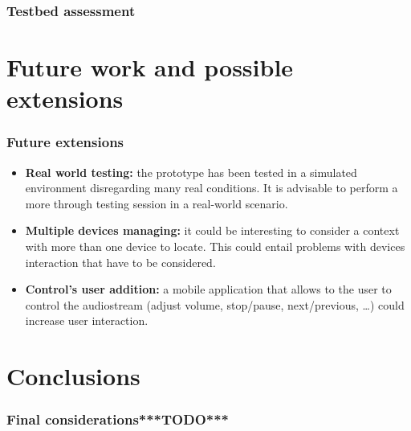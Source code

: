 \documentclass{beamer}
\begin{document}
\begin{frame}
		
		
		
		
		
		
		
		
		
		
	\end{frame}
	
	\begin{frame}
		\frametitle{Testbed assessment}
	\end{frame}
	

\section{Future work and possible extensions}

	
	\begin{frame}
		\frametitle{Future extensions}
		\begin{itemize}
		\item \textbf{Real world testing:} the prototype has been tested in a simulated environment disregarding many real conditions. It is advisable to perform a more through testing session in a real-world scenario. 
		\pause
		\item \textbf{Multiple devices managing:} it could be interesting to consider a context with more than one device to locate. This could entail problems with devices interaction that have to be considered.
		\pause
		\item \textbf{Control's user addition:} a mobile application that allows to the user to control the audiostream (adjust volume, stop/pause, next/previous, \ldots) could increase user interaction.
		\end{itemize}
	\end{frame}
	

\section{Conclusions}
	\begin{frame}
		\frametitle{Final considerations***TODO***}
	\end{frame}
\end{document}
